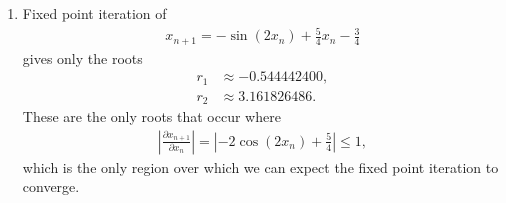 \documentclass[10pt]{article}
\begin{document}
\begin{enumerate}
\begin{enumerate}
      \item Fixed point iteration of \begin{align*}
          x_{n+1} = -\sin  (2x_n) + \frac{5}{4}x_n - \frac{3}{4}
      \end{align*} gives only the roots \begin{align*}
          r_1 &\approx -0.544442400, \\
          r_2 &\approx 3.161826486.
      \end{align*} These are the only roots that occur where \begin{align*}
          \left|\frac{\partial x_{n+1}}{\partial x_n}\right| = \left| -2\cos(2 x_n) + \frac{5}{4} \right| \leq 1,
      \end{align*} which is the only region over which we can expect the fixed point iteration to converge.
    \end{enumerate}

    {\small }   

\end{enumerate}
\end{document}
